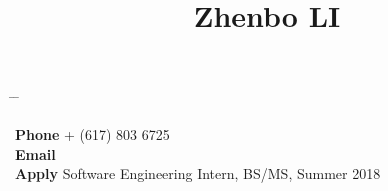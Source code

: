 

\title{Zhenbo LI} %

\vspace{-0.5cm}
\parbox[c][3em][t]{0.9\textwidth}{ %
	\begin{tabbing} %
		\hspace{3cm} \= \hspace{4cm} \= \kill %
		
{\bf Phone} \> + (617) 803 6725 \\ %
{\bf Email} \> \\
{\bf Apply} \> Software Engineering Intern, BS/MS, Summer 2018
		
	\end{tabbing}
}

\vspace{3mm}